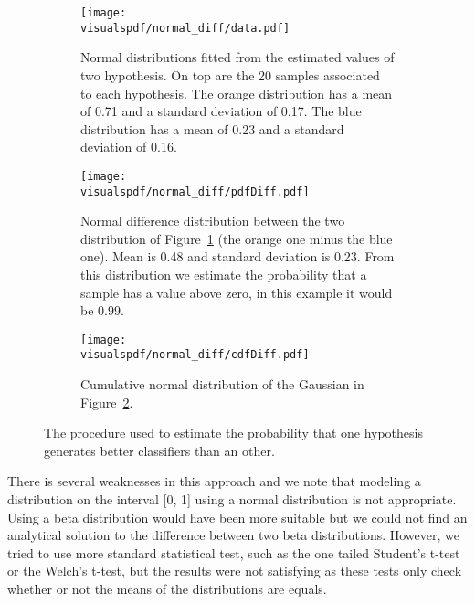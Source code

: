 \begin{figure}[!p]
\centering
    \begin{subfigure}[b]{\columnwidth}
        \centering
        \texttt{[image: \\visualspdf/normal\_diff/data.pdf]}
        \caption{Normal distributions fitted from the estimated values of two hypothesis. On top are the 20 samples associated to each hypothesis. The orange distribution has a mean of 0.71 and a standard deviation of 0.17. The blue distribution has a mean of 0.23 and a standard deviation of 0.16.}
        \label{fig:normaldifferencedistribution:data}
    \end{subfigure}
    \begin{subfigure}[b]{\columnwidth}
        \centering
        \texttt{[image: \\visualspdf/normal\_diff/pdfDiff.pdf]}
        \caption{Normal difference distribution between the two distribution of Figure~\ref{fig:normaldifferencedistribution:data} (the orange one minus the blue one). Mean is 0.48 and standard deviation is 0.23. From this distribution we estimate the probability that a sample has a value above zero, in this example it would be 0.99.}
        \label{fig:normaldifferencedistribution:pdf}
    \end{subfigure}
    \begin{subfigure}[b]{\columnwidth}
        \centering
        \texttt{[image: \\visualspdf/normal\_diff/cdfDiff.pdf]}
        \caption{Cumulative normal distribution of the Gaussian in Figure~\ref{fig:normaldifferencedistribution:pdf}.}
        \label{fig:normaldifferencedistribution:cdf}
    \end{subfigure}
\caption{The procedure used to estimate the probability that one hypothesis generates better classifiers than an other.}
\label{fig:normaldifferencedistribution}
\end{figure}

There is several weaknesses in this approach and we note that modeling a distribution on the interval [0, 1] using a normal distribution is not appropriate. Using a beta distribution would have been more suitable but we could not find an analytical solution to the difference between two beta distributions. However, we tried to use more standard statistical test, such as the one tailed Student's t-test or the Welch's t-test, but the results were not satisfying as these tests only check whether or not the means of the distributions are equals.

